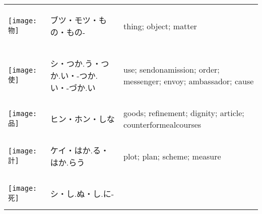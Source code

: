 \documentclass[a4paper,12pt]{extarticle}
\begin{document}
\begin{longtable}{|lp{6cm}p{4cm}|}
\\ 
\begin{minipage}{0.3\textwidth}
\centerline{
	\texttt{[image: 物]}
}
\end{minipage}
&
\begin{CJK}{UTF8}{min}ブツ・モツ・もの・もの-\end{CJK}
&
thing; object; matter
\\ 
\begin{minipage}{0.3\textwidth}
\centerline{
	\texttt{[image: 使]}
}
\end{minipage}
&
\begin{CJK}{UTF8}{min}シ・つか.う・つか.い・-つか.い・-づか.い\end{CJK}
&
use; sendonamission; order; messenger; envoy; ambassador; cause
\\ 
\begin{minipage}{0.3\textwidth}
\centerline{
	\texttt{[image: 品]}
}
\end{minipage}
&
\begin{CJK}{UTF8}{min}ヒン・ホン・しな\end{CJK}
&
goods; refinement; dignity; article; counterformealcourses
\\ 
\begin{minipage}{0.3\textwidth}
\centerline{
	\texttt{[image: 計]}
}
\end{minipage}
&
\begin{CJK}{UTF8}{min}ケイ・はか.る・はか.らう\end{CJK}
&
plot; plan; scheme; measure
\\ 
\begin{minipage}{0.3\textwidth}
\centerline{
	\texttt{[image: 死]}
}
\end{minipage}
&
\begin{CJK}{UTF8}{min}シ・し.ぬ・し.に-\end{CJK}

\end{longtable}
\end{document}
